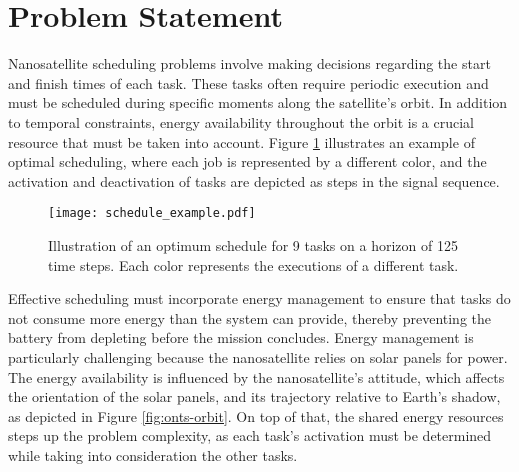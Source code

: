 % 


\section{Problem Statement}

Nanosatellite scheduling problems involve making decisions regarding the start and finish times of each task.
These tasks often require periodic execution and must be scheduled during specific moments along the satellite's orbit.
In addition to temporal constraints, energy availability throughout the orbit is a crucial resource that must be taken into account.
Figure \ref{fig:example-scheduling} illustrates an example of optimal scheduling, where each job is represented by a different color, and the activation and deactivation of tasks are depicted as steps in the signal sequence.

\begin{figure}[h]
    \centering
    \texttt{[image: schedule\_example.pdf]}
    \caption{Illustration of an optimum schedule for 9 tasks on a horizon of 125 time steps. Each color represents the executions of a different task.}
    \label{fig:example-scheduling}
\end{figure}

Effective scheduling must incorporate energy management to ensure that tasks do not consume more energy than the system can provide, thereby preventing the battery from depleting before the mission concludes.
Energy management is particularly challenging because the nanosatellite relies on solar panels for power.
The energy availability is influenced by the nanosatellite's attitude, which affects the orientation of the solar panels, and its trajectory relative to Earth's shadow, as depicted in Figure \ref{fig:onts-orbit}.
On top of that, the shared energy resources steps up the problem complexity, as each task's activation must be determined while taking into consideration the other tasks.

